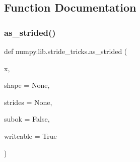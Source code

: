 \subsection{Function Documentation}
\mbox{\label{namespacenumpy_1_1lib_1_1stride__tricks_af0c7c89efa922680a51a6e861fc2628f}} 
\subsubsection{\texorpdfstring{as\+\_\+strided()}{as\_strided()}}
{\footnotesize\ttfamily def numpy.\+lib.\+stride\+\_\+tricks.\+as\+\_\+strided (\begin{DoxyParamCaption}\item[{}]{x,  }\item[{}]{shape = {\ttfamily None},  }\item[{}]{strides = {\ttfamily None},  }\item[{}]{subok = {\ttfamily False},  }\item[{}]{writeable = {\ttfamily True} }\end{DoxyParamCaption})}

